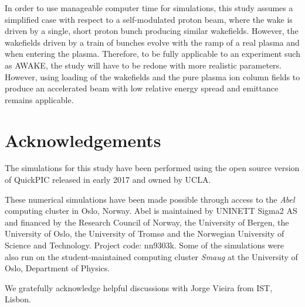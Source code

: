 \documentclass[aps,prstab,reprint,amsmath,amssymb,groupedaddress]{revtex4-1}
\begin{document}
In order to use manageable computer time for simulations, this study assumes a simplified case with respect to a self-modulated proton beam, where the wake is driven by a single, short proton bunch producing similar wakefields. However, the wakefields driven by a train of bunches evolve with the ramp of a real plasma and when entering the plasma. Therefore, to be fully applicable to an experiment such as AWAKE, the study will have to be redone with more realistic parameters. However, using loading of the wakefields and the pure plasma ion column fields to produce an accelerated beam with low relative energy spread and emittance remains applicable.

\section{Acknowledgements}\label{Ack}

The simulations for this study have been performed using the open source version of QuickPIC released in early 2017 and owned by UCLA.

These numerical simulations have been made possible through access to the \emph{Abel} computing cluster in Oslo, Norway. Abel is maintained by UNINETT Sigma2 AS and financed by the Research Council of Norway, the University of Bergen, the University of Oslo, the University of Troms{\o} and the Norwegian University of Science and Technology. Project code: nn9303k. Some of the simulations were also run on the student-maintained computing cluster \emph{Smaug} at the University of Oslo, Department of Physics.

We gratefully acknowledge helpful discussions with Jorge Vieira from IST, Lisbon.
\vfill


\end{document}
